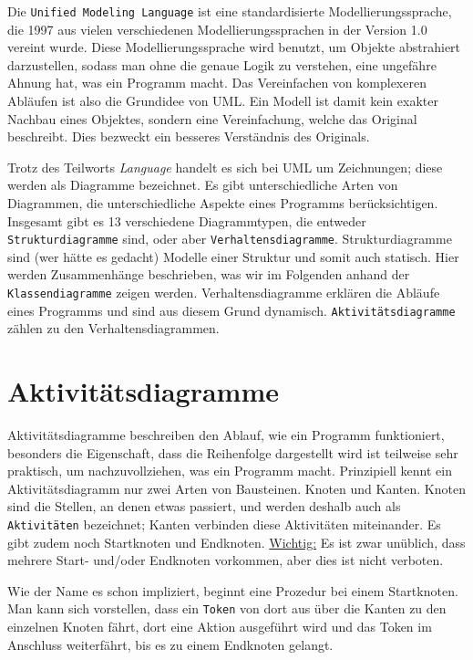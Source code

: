Die \texttt{Unified Modeling Language} ist eine standardisierte Modellierungssprache, die 1997 aus vielen verschiedenen Modellierungssprachen in der Version 1.0 vereint wurde. Diese Modellierungssprache wird benutzt, um Objekte abstrahiert darzustellen, sodass man ohne die genaue Logik zu verstehen, eine ungefähre Ahnung hat, was ein Programm macht. Das Vereinfachen von komplexeren Abläufen ist also die Grundidee von UML.
Ein Modell ist damit kein exakter Nachbau eines Objektes, sondern eine Vereinfachung, welche das Original beschreibt. Dies bezweckt ein besseres Verständnis des Originals.

Trotz des Teilworts \textit{Language} handelt es sich bei UML um Zeichnungen; diese werden als Diagramme bezeichnet. Es gibt unterschiedliche Arten von Diagrammen, die unterschiedliche Aspekte eines Programms berücksichtigen. Insgesamt gibt es 13 verschiedene Diagrammtypen, die entweder \texttt{Strukturdiagramme} sind, oder aber \texttt{Verhaltensdiagramme}. Strukturdiagramme sind (wer hätte es gedacht) Modelle einer Struktur und somit auch statisch. Hier werden Zusammenhänge beschrieben, was wir im Folgenden anhand der \texttt{Klassendiagramme} zeigen werden. Verhaltensdiagramme erklären die Abläufe eines Programms und sind aus diesem Grund dynamisch. \texttt{Aktivitätsdiagramme} zählen zu den Verhaltensdiagrammen.

\section{Aktivitätsdiagramme}

Aktivitätsdiagramme beschreiben den Ablauf, wie ein Programm funktioniert, besonders die Eigenschaft, dass die Reihenfolge dargestellt wird ist teilweise sehr praktisch, um nachzuvollziehen, was ein Programm macht. Prinzipiell kennt ein Aktivitätsdiagramm nur zwei Arten von Bausteinen. Knoten und Kanten. Knoten sind die Stellen, an denen etwas passiert, und werden deshalb auch als \texttt{Aktivitäten} bezeichnet; Kanten verbinden diese Aktivitäten miteinander. Es gibt zudem noch Startknoten und Endknoten. \underline{Wichtig:} Es ist zwar unüblich, dass mehrere Start- und/oder Endknoten vorkommen, aber dies ist nicht verboten.

Wie der Name es schon impliziert, beginnt eine Prozedur bei einem Startknoten. Man kann sich vorstellen, dass ein \texttt{Token} von dort aus über die Kanten zu den einzelnen Knoten fährt, dort eine Aktion ausgeführt wird und das Token im Anschluss weiterfährt, bis es zu einem Endknoten gelangt.

